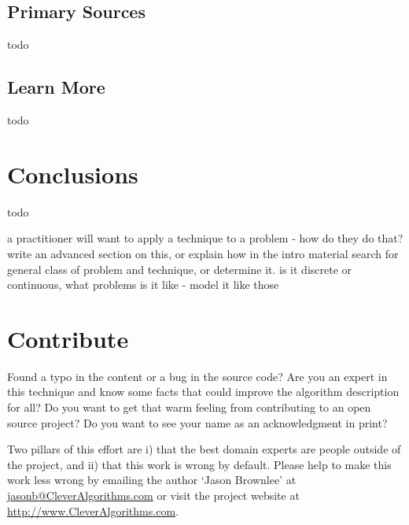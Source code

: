 \documentclass[a4paper, 11pt]{article}
\makeatletter
\newcommand{\myreportauthor}{Jason Brownlee}
\newcommand{\myreportemail}{jasonb@CleverAlgorithms.com}
\newcommand{\myreportwebsite}{http://www.CleverAlgorithms.com}
\makeatother
\begin{document}
% 
% 
\subsection{Primary Sources}
todo

% 
% 
\subsection{Learn More}
todo


% 
% 
\section{Conclusions}
\label{sec:conclusions}
todo

a practitioner will want to apply a technique to a problem - how do they do that?
write an advanced section on this, or explain how in the intro material
search for general class of problem and technique, or determine it. is it discrete or continuous, what problems is it like - model it like those


% 
% 
\section{Contribute}
\label{sec:contribute}
Found a typo in the content or a bug in the source code? 
Are you an expert in this technique and know some facts that could improve the algorithm description for all?
Do you want to get that warm feeling from contributing to an open source project? 
Do you want to see your name as an acknowledgment in print?

Two pillars of this effort are i) that the best domain experts are people outside of the project, and ii) that this work is wrong by default. 
Please help to make this work less wrong by emailing the author `\myreportauthor' at \url{\myreportemail} or visit the project website at \url{\myreportwebsite}.



\end{document}
